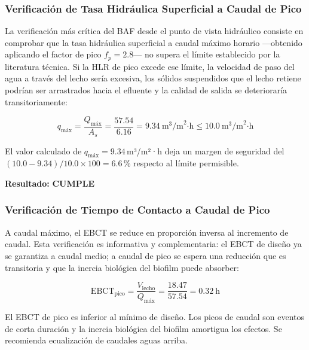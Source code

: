 \documentclass[12pt,a4paper]{article}
\begin{document}
\subsubsection*{Verificación de Tasa Hidráulica Superficial a Caudal de Pico}

La verificación más crítica del BAF desde el punto de vista hidráulico consiste en comprobar que la tasa hidráulica superficial a caudal máximo horario —obtenido aplicando el factor de pico $f_p = 2.8$— no supera el límite establecido por la literatura técnica. Si la HLR de pico excede ese límite, la velocidad de paso del agua a través del lecho sería excesiva, los sólidos suspendidos que el lecho retiene podrían ser arrastrados hacia el efluente y la calidad de salida se deterioraría transitoriamente:

\begin{equation}
q_{\text{máx}} = \frac{Q_{\text{máx}}}{A_{s}} = \frac{57.54}{6.16} = 9.34\ \text{m}^3\text{/m}^2\text{·h} \leq 10.0\ \text{m}^3\text{/m}^2\text{·h}
\end{equation}

El valor calculado de $q_{\text{máx}} = 9.34$\,m³/m²·h deja un margen de seguridad del $(10.0 - 9.34) / 10.0 \times 100 = 6.6$\,\% respecto al límite permisible.

\textbf{Resultado:} \textbf{CUMPLE}

\subsubsection*{Verificación de Tiempo de Contacto a Caudal de Pico}

A caudal máximo, el EBCT se reduce en proporción inversa al incremento de caudal. Esta verificación es informativa y complementaria: el EBCT de diseño ya se garantiza a caudal medio; a caudal de pico se espera una reducción que es transitoria y que la inercia biológica del biofilm puede absorber:

\begin{equation}
\text{EBCT}_{\text{pico}} = \frac{V_{\text{lecho}}}{Q_{\text{máx}}} = \frac{18.47}{57.54} = 0.32\ \text{h}
\end{equation}

El EBCT de pico es inferior al mínimo de diseño. Los picos de caudal son eventos de corta duración y la inercia biológica del biofilm amortigua los efectos. Se recomienda ecualización de caudales aguas arriba.
\end{document}
